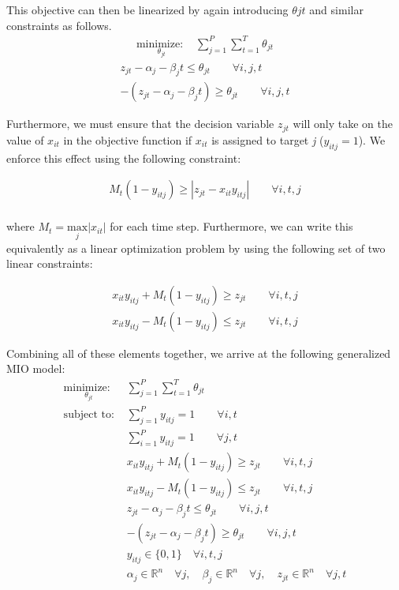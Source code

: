 \documentclass[journal]{IEEEtran}
\begin{document}
This objective can then be linearized by again introducing $\theta{jt}$ and similar constraints as follows. 
\begin{align}\label{eq:generalized_linear_objective}
\underset{\theta_{jt}}{\text{minimize: }} & \sum_{j=1}^{P} \sum_{t=1}^{T} \theta_{jt}
\end{align}
\begin{align}
z_{jt} - \alpha_{j} - \beta_{j}t \leq \theta_{jt} \qquad \forall i,j,t\\
-(z_{jt} - \alpha_{j} - \beta_{j}t) \geq \theta_{jt} \qquad \forall i,j,t
\end{align}
 
Furthermore, we must ensure that the decision variable $z_{jt}$ will only take on the value of $x_{it}$ in the objective function if $x_{it}$ is assigned to target \textit{j} ($y_{itj} = 1$). We enforce this effect using the following constraint:

\begin{align}
M_{t}(1-y_{itj}) \geq |z_{jt} - x_{it}y_{itj}| \qquad \forall i,t,j\\
\end{align}

where $M_{t} = \underset{j}{\text{max}}|x_{it}|$ for each time step. Furthermore, we can write this equivalently as a linear optimization problem by using the following set of two linear constraints:

\begin{align}
x_{it}y_{itj} + M_{t}(1-y_{itj}) \geq z_{jt} \qquad \forall i,t,j\\
x_{it}y_{itj} - M_{t}(1-y_{itj}) \leq z_{jt} \qquad \forall i,t,j
\end{align}

Combining all of these elements together, we arrive at the following generalized MIO model:
\begin{align*}
\underset{\theta_{jt}}{\text{minimize: }} & \sum_{j=1}^{P} \sum_{t=1}^{T} \theta_{jt} \\
\text{subject to: }	& \sum_{j=1}^{P} y_{itj} = 1 \qquad \forall i,t\\
				& \sum_{i=1}^{P} y_{itj} = 1 \qquad \forall j,t\\
				& x_{it}y_{itj} + M_{t}(1-y_{itj}) \geq z_{jt} \qquad \forall i,t,j\\
				& x_{it}y_{itj} - M_{t}(1-y_{itj}) \leq z_{jt} \qquad \forall i,t,j\\
				& z_{jt} - \alpha_{j} - \beta_{j}t \leq \theta_{jt} \qquad \forall i,j,t\\
				& -(z_{jt} - \alpha_{j} - \beta_{j}t) \geq \theta_{jt} \qquad \forall i,j,t\\
			 	& y_{itj} \in \{0,1\} \quad \forall i,t,j\\
				& \alpha_{j} \in \mathbb{R}^n \quad \forall j,\quad \beta_{j} \in \mathbb{R}^n \quad \forall j, \quad z_{jt} \in \mathbb{R}^n \quad \forall j,t\\
\end{align*}
\end{document}
